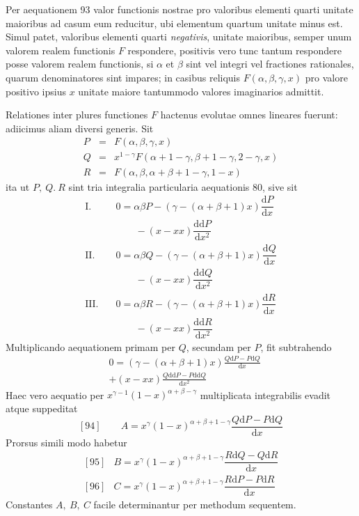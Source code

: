 Per aequationem 93 valor functionis nostrae pro valoribus elementi quarti unitate maioribus ad casum eum reducitur, ubi elementum quartum unitate minus est. Simul patet, valoribus elementi quarti \textit{negativis}, unitate maioribus, semper unum valorem realem functionis \(F\) respondere, positivis vero tunc tantum respondere posse valorem realem functionis, si \(\alpha\) et \(\beta\) sint vel integri vel fractiones rationales, quarum denominatores sint impares; in casibus reliquis \(F(\alpha,\beta,\gamma,x)\) pro valore positivo ipsius \(x\) unitate maiore tantummodo valores imaginarios admittit.

Relationes inter plures functiones \(F\) hactenus evolutae omnes lineares fuerunt: adiicimus aliam diversi generis. Sit
\[
\begin{array}{rcl}
P&=&F(\alpha,\beta,\gamma,x)\\
Q&=&x^{1-\gamma}F(\alpha+1-\gamma,\beta+1-\gamma,2-\gamma,x)\\
R&=&F(\alpha,\beta,\alpha+\beta+1-\gamma,1-x)
\end{array}
\]
ita ut \(P,\ Q.\ R\) sint tria integralia particularia aequationis 80, sive sit
\[
\begin{aligned}
\mathrm{I.}\quad&0=\alpha\beta P-(\gamma-(\alpha+\beta+1)x)\dfrac{\mathrm dP}{\mathrm dx}\\&\qquad-(x-xx)\dfrac{\mathrm{dd}P}{\mathrm dx^2}\\[4pt]
\mathrm{II.}\quad&0=\alpha\beta Q-(\gamma-(\alpha+\beta+1)x)\dfrac{\mathrm dQ}{\mathrm dx}\\&\qquad-(x-xx)\dfrac{\mathrm{dd}Q}{\mathrm dx^2}\\[4pt]
\mathrm{III.}\quad&0=\alpha\beta R-(\gamma-(\alpha+\beta+1)x)\dfrac{\mathrm dR}{\mathrm dx}\\&\qquad-(x-xx)\dfrac{\mathrm{dd}R}{\mathrm dx^2}
\end{aligned}
\]
Multiplicando aequationem primam per \(Q\), secundam per \(P\), fit subtrahendo
\[
\begin{aligned}&0=(\gamma-(\alpha+\beta+1)x)\frac{Q\mathrm dP-P\mathrm dQ}{\mathrm dx}\\&+(x-xx)\frac{Q\mathrm{dd}P-P\mathrm{dd}Q}{\mathrm dx^2}\end{aligned}
\]
Haec vero aequatio per \(x^{\gamma-1}(1-x)^{\alpha+\beta-\gamma}\) multiplicata integrabilis evadit atque suppeditat
\[
[94]\qquad A=x^\gamma(1-x)^{\alpha+\beta+1-\gamma}\frac{Q\mathrm dP-P\mathrm dQ}{\mathrm dx}
\]
Prorsus simili modo habetur
\[
\begin{array}{rl}
[95]&B=x^\gamma(1-x)^{\alpha+\beta+1-\gamma}\dfrac{R\mathrm dQ-Q\mathrm dR}{\mathrm dx}\\[11pt]
[96]&C=x^\gamma(1-x)^{\alpha+\beta+1-\gamma}\dfrac{R\mathrm dP-P\mathrm dR}{\mathrm dx}
\end{array}
\]
Constantes \(A,\ B,\ C\) facile determinantur per methodum sequentem.

